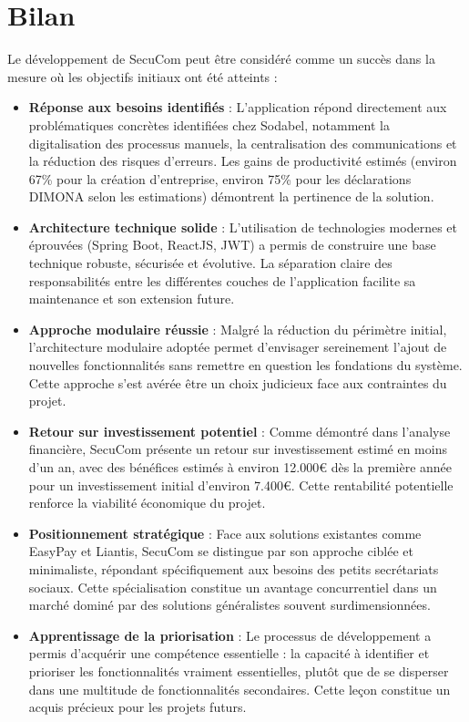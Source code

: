 \section*{Bilan}

Le développement de SecuCom peut être considéré comme un succès dans la mesure où les objectifs initiaux ont été atteints :

\begin{itemize}
  \item \textbf{Réponse aux besoins identifiés} : L'application répond directement aux problématiques concrètes identifiées chez Sodabel, notamment la digitalisation des processus manuels, la centralisation des communications et la réduction des risques d'erreurs. Les gains de productivité estimés (environ 67\% pour la création d'entreprise, environ 75\% pour les déclarations DIMONA selon les estimations) démontrent la pertinence de la solution.

  \item \textbf{Architecture technique solide} : L'utilisation de technologies modernes et éprouvées (Spring Boot, ReactJS, JWT) a permis de construire une base technique robuste, sécurisée et évolutive. La séparation claire des responsabilités entre les différentes couches de l'application facilite sa maintenance et son extension future.

  \item \textbf{Approche modulaire réussie} : Malgré la réduction du périmètre initial, l'architecture modulaire adoptée permet d'envisager sereinement l'ajout de nouvelles fonctionnalités sans remettre en question les fondations du système. Cette approche s'est avérée être un choix judicieux face aux contraintes du projet.

  \item \textbf{Retour sur investissement potentiel} : Comme démontré dans l'analyse financière, SecuCom présente un retour sur investissement estimé en moins d'un an, avec des bénéfices estimés à environ 12.000€ dès la première année pour un investissement initial d'environ 7.400€. Cette rentabilité potentielle renforce la viabilité économique du projet.

  \item \textbf{Positionnement stratégique} : Face aux solutions existantes comme EasyPay et Liantis, SecuCom se distingue par son approche ciblée et minimaliste, répondant spécifiquement aux besoins des petits secrétariats sociaux. Cette spécialisation constitue un avantage concurrentiel dans un marché dominé par des solutions généralistes souvent surdimensionnées.

  \item \textbf{Apprentissage de la priorisation} : Le processus de développement a permis d'acquérir une compétence essentielle : la capacité à identifier et prioriser les fonctionnalités vraiment essentielles, plutôt que de se disperser dans une multitude de fonctionnalités secondaires. Cette leçon constitue un acquis précieux pour les projets futurs.
\end{itemize}

